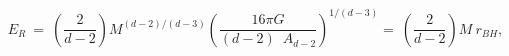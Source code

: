 \begin{equation}
E_R ~=~\left(\frac{2}{d-2}\right)  M^{(d-2)/(d-3)} 
\left( \frac{16\pi G}{(d-2) \;~A_{d-2}} \right)^{1/(d-3)} 
=~ \left(\frac{2}{d-2}\right)  M~ r_{BH},
\end{equation} 

